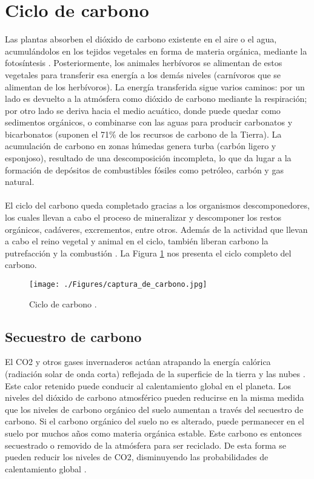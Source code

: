 \section{Ciclo de carbono} 
Las plantas absorben el di\'oxido de carbono existente en el aire o el agua, acumul\'andolos en los tejidos vegetales en forma de materia org\'anica, mediante la fotos\'intesis \cite{natur2015PW}. Posteriormente, los animales herb\'ivoros se alimentan de estos vegetales para transferir esa energ\'ia a los dem\'as niveles (carn\'ivoros que se alimentan de los herb\'ivoros).
La energ\'ia transferida sigue varios caminos: por un lado es devuelto a la atm\'osfera como di\'oxido de carbono mediante la respiraci\'on; por otro lado se deriva hacia el medio acu\'atico, donde puede quedar como sedimentos org\'anicos, o combinarse con las aguas para producir carbonatos y bicarbonatos (suponen el 71\% de los recursos de carbono de la Tierra). La acumulaci\'on de carbono en zonas h\'umedas genera turba (carb\'on ligero y esponjoso), resultado de una descomposici\'on incompleta, lo que da lugar a la formaci\'on de dep\'ositos de combustibles f\'osiles como petr\'oleo, carb\'on y gas natural.\\~\\
El ciclo del carbono queda completado gracias a los organismos des\-componedores, los cuales llevan a cabo el proceso de mineralizar y descomponer los restos org\'anicos, cad\'averes, excrementos, entre otros. Adem\'as de la actividad que llevan a cabo el reino vegetal y animal en el ciclo, tambi\'en liberan carbono la putrefacci\'on y la combusti\'on \cite{natur2015PW}. La Figura \ref{fig:ciclocarbono} nos presenta el ciclo completo del carbono.
    \begin{figure}[!hbtp]
    	\centering
    	\texttt{[image: ./Figures/captura\_de\_carbono.jpg]}
    	\caption{Ciclo de carbono \cite{ciclot2015carbo}.}
    	\label{fig:ciclocarbono}
    \end{figure}


\subsection{Secuestro de carbono}
El CO2 y otros gases invernaderos act\'uan atrapando la energ\'ia cal\'orica (radiaci\'on solar de onda corta) reflejada de la superficie de la tierra y las nubes \cite{encaptura}. Este calor retenido puede conducir al calentamiento global en el planeta. Los niveles del di\'oxido de carbono atmosf\'erico pueden reducirse en la misma medida que los niveles de carbono org\'anico del suelo aumentan a trav\'es del secuestro de carbono. Si el carbono org\'anico del suelo no es alterado, puede permanecer en el suelo por muchos a\~{n}os como materia org\'anica estable. Este carbono es entonces secuestrado o removido de la atm\'osfera para ser reciclado. De esta forma se pueden reducir los niveles de CO2, disminuyendo las probabilidades de calentamiento global \cite{castillo2003manejo}.
